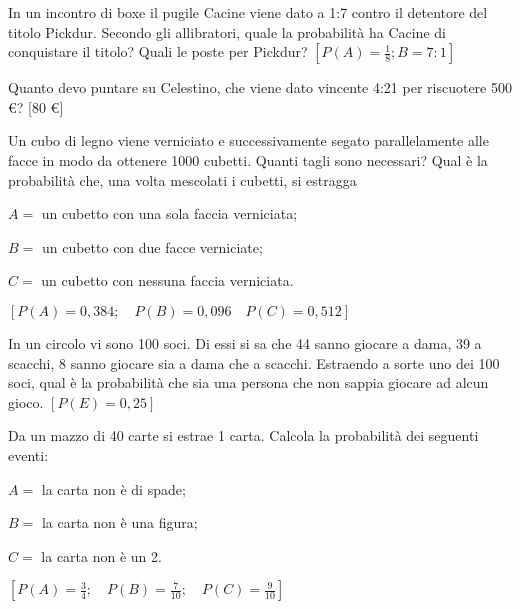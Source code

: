 \begin{esercizio}[\Ast]
 \label{ese:9.41}
In un incontro di boxe il pugile Cacine viene dato a 1:7 contro il detentore del 
titolo Pickdur.
Secondo gli allibratori, quale la probabilità ha Cacine di conquistare il 
titolo?
Quali le poste per Pickdur?
\hfill $\left[P(A)=\frac 1 8;B=7:1\right]$
\end{esercizio}

\begin{esercizio}[\Ast]
 \label{ese:9.42}
Quanto devo puntare su Celestino, che viene dato vincente 4:21 per riscuotere 
500 €?
\hfill [80 €]
\end{esercizio}

\begin{esercizio}[\Ast]
 \label{ese:9.43}
Un cubo di legno viene verniciato e successivamente segato parallelamente alle 
facce in modo da ottenere 1000 cubetti. Quanti tagli sono necessari? Qual è la 
probabilità che, una volta mescolati i cubetti, si estragga
\begin{itemize*}
\item $ A= $ un cubetto con una sola faccia verniciata;
\item $ B= $ un cubetto con due facce verniciate;
\item $ C= $ un cubetto con nessuna faccia verniciata.
\end{itemize*}
\hfill $\left[P(A)=0,384; \quad P(B)=0,096 \quad P(C)=0,512\right]$
\end{esercizio}

\begin{esercizio}[\Ast]
 \label{ese:9.44}
In un circolo vi sono 100 soci. Di essi si sa che 44 sanno giocare a dama, 39 a 
scacchi, 8 sanno giocare sia a dama che a scacchi. Estraendo a sorte uno dei 100 
soci, qual è la probabilità che sia una persona che non sappia giocare ad alcun 
gioco.
\hfill $\left[P(E)=0,25\right]$
\end{esercizio}

\begin{esercizio}[\Ast]
 \label{ese:9.45}
Da un mazzo di 40 carte si estrae 1 carta. Calcola la probabilità dei seguenti 
eventi:
\begin{itemize*}
\item $ A= $ la carta non è di spade;
\item $ B= $ la carta non è una figura;
\item $ C= $ la carta non è un 2.
\end{itemize*}
\hfill $\left[P(A)=\frac 3 4; \quad P(B)=\frac 7{10}; \quad 
P(C)=\frac 9{10}\right]$
\end{esercizio}


